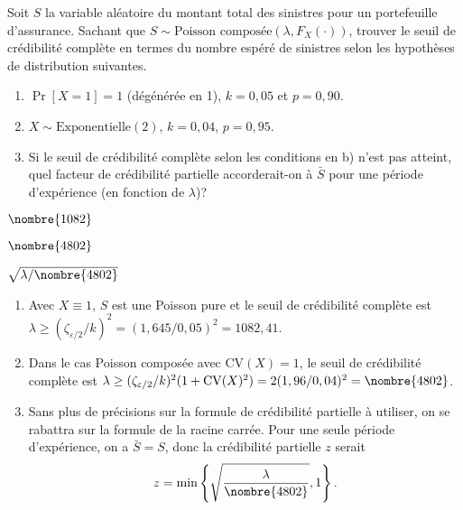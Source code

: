 \begin{exercice}
  Soit $S$ la variable aléatoire du montant total des sinistres pour
  un portefeuille d'assurance. Sachant que $S \sim \text{Poisson
    composée}(\lambda, F_X(\cdot))$, trouver le seuil de crédibilité
  complète en termes du nombre espéré de sinistres selon les
  hypothèses de distribution suivantes.
  \begin{enumerate}
  \item $\Pr[X = 1] = 1$ (dégénérée en 1), $k = 0,05$ et $p = 0,90$.
  \item $X \sim \text{Exponentielle}(2)$, $k = 0,04$, $p = 0,95$.
  \item Si le seuil de crédibilité complète selon les conditions en b)
    n'est pas atteint, quel facteur de crédibilité partielle
    accorderait-on à $\bar{S}$ pour une période d'expérience (en
    fonction de $\lambda$)?
  \end{enumerate}
  \begin{rep}
    \begin{inparaenum}
    \item $\nombre{1082}$
    \item $\nombre{4802}$
    \item $\sqrt{\lambda/\nombre{4802}}$
    \end{inparaenum}
  \end{rep}
  \begin{sol}
    \begin{enumerate}
    \item Avec $X \equiv 1$, $S$ est une Poisson pure et le seuil de
      crédibilité complète est $\lambda \geq
      (\zeta_{\varepsilon/2}/k)^2 = (1,645/0,05)^2 = 1082,41$.
    \item Dans le cas Poisson composée avec $\mathrm{CV}(X) = 1$, le
      seuil de crédibilité complète est $\lambda \geq
      (\zeta_{\varepsilon/2}/k)^2 (1 + \mathrm{CV}(X)^2) = 2
      (1,96/0,04)^2 = \nombre{4802}$.
    \item Sans plus de précisions sur la formule de crédibilité
      partielle à utiliser, on se rabattra sur la formule de la racine
      carrée. Pour une seule période d'expérience, on a $\bar{S} = S$,
      donc la crédibilité partielle $z$ serait
      \begin{displaymath}
        z = \min
        \left\{
          \sqrt{\frac{\lambda}{\nombre{4802}}}, 1
        \right\}.
      \end{displaymath}
    \end{enumerate}
  \end{sol}
\end{exercice}

